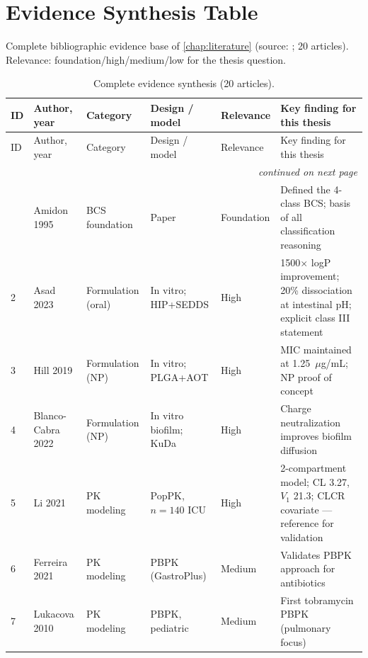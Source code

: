 \chapter{Evidence Synthesis Table}
\label{chap:app-evidence}

Complete bibliographic evidence base of \cref{chap:literature} (source: ; 20 articles). Relevance: foundation/high/medium/low for the thesis question.

\begin{landscape}
\begin{longtable}{p{0.9cm}p{1.7cm}p{2.0cm}p{3.6cm}p{2.2cm}p{6.8cm}}
\caption{Complete evidence synthesis (20 articles).}\label{tab:evidence-full}\\
\toprule
ID & Author, year & Category & Design / model & Relevance & Key finding for this thesis\\
\midrule
\endfirsthead
\toprule
ID & Author, year & Category & Design / model & Relevance & Key finding for this thesis\\
\midrule
\endhead
\midrule
\multicolumn{6}{r}{\emph{continued on next page}}\\
\endfoot
\bottomrule
\endlastfoot
1 & Amidon 1995 \citep{Amidon1995} & BCS foundation & Paper & Foundation & Defined the 4-class BCS; basis of all classification reasoning\\
2 & Asad 2023 \citep{Asad2023} & Formulation (oral) & In vitro; HIP+SEDDS & High & 1500$\times$ logP improvement; 20\% dissociation at intestinal pH; explicit class III statement\\
3 & Hill 2019 \citep{Hill2019} & Formulation (NP) & In vitro; PLGA+AOT & High & MIC maintained at 1.25~$\mu$g/mL; NP proof of concept\\
4 & Blanco-Cabra 2022 \citep{BlancoCabra2022} & Formulation (NP) & In vitro biofilm; KuDa & High & Charge neutralization improves biofilm diffusion\\
5 & Li 2021 \citep{Li2021} & PK modeling & PopPK, $n=140$ ICU & High & 2-compartment model; CL 3.27, $V_1$ 21.3; CLCR covariate --- reference for validation\\
6 & Ferreira 2021 \citep{Ferreira2021} & PK modeling & PBPK (GastroPlus) & Medium & Validates PBPK approach for antibiotics\\
7 & Lukacova 2010 \citep{Lukacova2010} & PK modeling & PBPK, pediatric & Medium & First tobramycin PBPK (pulmonary focus)\\

\end{longtable}
\end{landscape}
